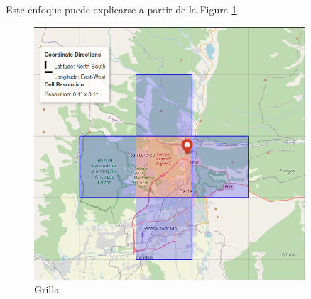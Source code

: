 Este enfoque puede explicarse a partir de la Figura \ref{fig:gridSA}



\begin{figure}
    \centering
    \includegraphics[width=0.9\textwidth]{figuras/gridSA.png}
    \caption{Grilla }
    \label{fig:gridSA}
\end{figure}


